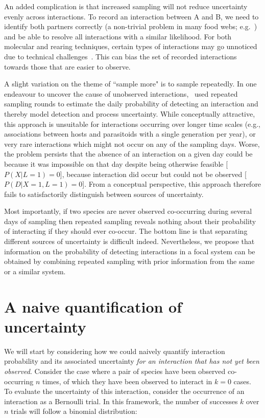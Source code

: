 \documentclass[12pt]{article}
\begin{document}
\begin{spacing}{2.0}
    An added complication is that increased sampling will not reduce uncertainty evenly across interactions. To record an interaction between A and B, we need to identify both partners correctly (a non-trivial problem in many food webs; e.g.~\citealp{Kaartinen2011,Roslin2016}) and be able to resolve all interactions with a similar likelihood. For both molecular and rearing techniques, certain types of interactions may go unnoticed due to technical challenges~\citep{Wirta2014}. This can bias the set of recorded interactions towards those that are easier to observe.


    A slight variation on the theme of ``sample more" is to sample repeatedly. In one endeavour to uncover the cause of unobserved interactions,~\citet{Weinstein2017} used repeated sampling rounds to estimate the daily probability of detecting an interaction and thereby model detection and process uncertainty. While conceptually attractive, this approach is unsuitable for interactions occurring over longer time scales (e.g., associations between hosts and parasitoids with a single generation per year), or very rare interactions which might not occur on any of the sampling days. Worse, the problem persists that the absence of an interaction on a given day could be because it was impossible on that day despite being otherwise feasible [$P(X|L=1)=0$], because interaction did occur but could not be observed [$P(D|X=1,L=1)=0$]. From a conceptual perspective, this approach therefore fails to satisfactorily distinguish between sources of uncertainty. 


    Most importantly, if two species are never observed co-occurring during several days of sampling then repeated sampling reveals nothing about their probability of interacting if they should ever co-occur. The bottom line is that separating different sources of uncertainty is difficult indeed. Nevertheless, we propose that information on the probability of detecting interactions in a focal system can be obtained by combining repeated sampling with prior information from the same or a similar system.


\section*{A naive quantification of uncertainty}

  We will start by considering how we could naively quantify interaction probability and its associated uncertainty \emph{for an interaction that has not yet been observed}. Consider the case where a pair of species have been observed co-occurring $n$ times, of which they have been observed to interact in $k = 0$ cases. To evaluate the uncertainty of this interaction, consider the occurrence of an interaction as a Bernoulli trial. In this framework, the number of successes $k$ over $n$ trials will follow a binomial distribution: 
      

\end{spacing}
\end{document}
